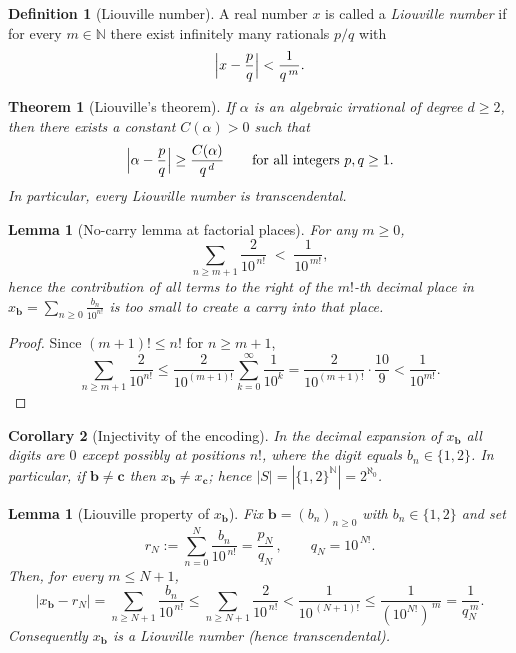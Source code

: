 \documentclass[11pt,a4paper]{article}
\newtheorem{theorem}{Theorem}
\newtheorem{corollary}[theorem]{Corollary}
\theoremstyle{definition}
\theoremstyle{definition}
\newtheorem{definition}[exercise]{Definition}
\theoremstyle{plain}
\newtheorem{lemma}[exercise]{Lemma}
\theoremstyle{remark}
\begin{document}
\begin{definition}[Liouville number]
	A real number $x$ is called a \emph{Liouville number} if for every $m\in\mathbb N$
	there exist infinitely many rationals $p/q$ with
	\[
	\Bigl|x-\frac{p}{q}\Bigr|<\frac{1}{q^{\,m}}.
	\]
\end{definition}

\begin{theorem}[Liouville's theorem]
	If $\alpha$ is an algebraic irrational of degree $d\ge2$, then there exists a constant
	$C(\alpha)>0$ such that
	\[
	\Bigl|\alpha-\frac{p}{q}\Bigr|\ge \frac{C(\alpha)}{q^{\,d}}
	\qquad\text{for all integers }p,q\ge1.
	\]
	In particular, every Liouville number is transcendental.
\end{theorem}

\begin{lemma}[No-carry lemma at factorial places]\label{lem:no-carry}
	For any $m\ge0$,
	\[
	\sum_{n\ge m+1}\frac{2}{10^{\,n!}}
	\;<\;\frac{1}{10^{\,m!}}\!,
	\]
	hence the contribution of all terms to the right of the $m!$-th decimal place in
	$\displaystyle x_{\mathbf b}=\sum_{n\ge0}\frac{b_n}{10^{n!}}$ is too small to create a carry into that place.
\end{lemma}

\begin{proof}
	Since $(m+1)! \le n!$ for $n\ge m+1$,
	\[
	\sum_{n\ge m+1}\frac{2}{10^{n!}}
	\le \frac{2}{10^{(m+1)!}}\sum_{k=0}^{\infty}\frac{1}{10^{k}}
	=\frac{2}{10^{(m+1)!}}\cdot\frac{10}{9}
	<\frac{1}{10^{m!}}.
	\]
\end{proof}

\begin{corollary}[Injectivity of the encoding]\label{cor:injective}
	In the decimal expansion of $x_{\mathbf b}$ all digits are $0$ except possibly at positions
	$n!$, where the digit equals $b_n\in\{1,2\}$. In particular, if $\mathbf b\neq\mathbf c$ then
	$x_{\mathbf b}\neq x_{\mathbf c}$; hence $|S|=|\{1,2\}^{\mathbb N}|=2^{\aleph_0}$.
\end{corollary}

\begin{lemma}[Liouville property of $x_{\mathbf b}$]\label{lem:liouville}
	Fix $\mathbf b=(b_n)_{n\ge0}$ with $b_n\in\{1,2\}$ and set
	\[
	r_N:=\sum_{n=0}^{N}\frac{b_n}{10^{\,n!}}=\frac{p_N}{q_N}\,,\qquad q_N=10^{\,N!}.
	\]
	Then, for every $m\le N+1$,
	\[
	\bigl|x_{\mathbf b}-r_N\bigr|
	=\sum_{n\ge N+1}\frac{b_n}{10^{\,n!}}
	\le \sum_{n\ge N+1}\frac{2}{10^{\,n!}}
	<\frac{1}{10^{\,(N+1)!}}
	\le \frac{1}{(10^{N!})^{\,m}}
	=\frac{1}{q_N^{\,m}}.
	\]
	Consequently $x_{\mathbf b}$ is a Liouville number (hence transcendental).
\end{lemma}
\end{document}

